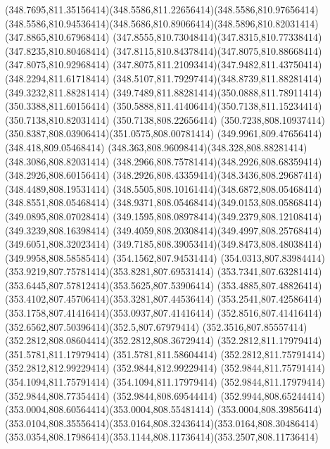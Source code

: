 {{	\curveto(348.7695,811.35156414)(348.5586,811.22656414)(348.5586,810.97656414)
	\curveto(348.5586,810.94536414)(348.5686,810.89066414)(348.5896,810.82031414)
	\lineto(347.8865,810.67968414)
	\curveto(347.8555,810.73048414)(347.8315,810.77338414)(347.8235,810.80468414)
	\curveto(347.8115,810.84378414)(347.8075,810.88668414)(347.8075,810.92968414)
	\curveto(347.8075,811.21093414)(347.9482,811.43750414)(348.2294,811.61718414)
	\curveto(348.5107,811.79297414)(348.8739,811.88281414)(349.3232,811.88281414)
	\curveto(349.7489,811.88281414)(350.0888,811.78911414)(350.3388,811.60156414)
	\curveto(350.5888,811.41406414)(350.7138,811.15234414)(350.7138,810.82031414)
	\lineto(350.7138,808.22656414)
	\curveto(350.7238,808.10937414)(350.8387,808.03906414)(351.0575,808.00781414)
	\closepath
	\moveto(349.9961,809.47656414)
	\lineto(348.418,809.05468414)
	\curveto(348.363,808.96098414)(348.328,808.88281414)(348.3086,808.82031414)
	\curveto(348.2966,808.75781414)(348.2926,808.68359414)(348.2926,808.60156414)
	\curveto(348.2926,808.43359414)(348.3436,808.29687414)(348.4489,808.19531414)
	\curveto(348.5505,808.10161414)(348.6872,808.05468414)(348.8551,808.05468414)
	\curveto(348.9371,808.05468414)(349.0153,808.05868414)(349.0895,808.07028414)
	\curveto(349.1595,808.08978414)(349.2379,808.12108414)(349.3239,808.16398414)
	\curveto(349.4059,808.20308414)(349.4997,808.25768414)(349.6051,808.32023414)
	\curveto(349.7185,808.39053414)(349.8473,808.48038414)(349.9958,808.58585414)
	\closepath
	\moveto(354.1562,807.94531414)
	\curveto(354.0313,807.83984414)(353.9219,807.75781414)(353.8281,807.69531414)
	\curveto(353.7341,807.63281414)(353.6445,807.57812414)(353.5625,807.53906414)
	\curveto(353.4885,807.48826414)(353.4102,807.45706414)(353.3281,807.44536414)
	\curveto(353.2541,807.42586414)(353.1758,807.41416414)(353.0937,807.41416414)
	\curveto(352.8516,807.41416414)(352.6562,807.50396414)(352.5,807.67979414)
	\curveto(352.3516,807.85557414)(352.2812,808.08604414)(352.2812,808.36729414)
	\lineto(352.2812,811.17979414)
	\lineto(351.5781,811.17979414)
	\lineto(351.5781,811.58604414)
	\lineto(352.2812,811.75791414)
	\lineto(352.2812,812.99229414)
	\lineto(352.9844,812.99229414)
	\lineto(352.9844,811.75791414)
	\lineto(354.1094,811.75791414)
	\lineto(354.1094,811.17979414)
	\lineto(352.9844,811.17979414)
	\lineto(352.9844,808.77354414)
	\lineto(352.9844,808.69544414)
	\curveto(352.9944,808.65244414)(353.0004,808.60564414)(353.0004,808.55481414)
	\lineto(353.0004,808.39856414)
	\curveto(353.0104,808.35556414)(353.0164,808.32436414)(353.0164,808.30486414)
	\curveto(353.0354,808.17986414)(353.1144,808.11736414)(353.2507,808.11736414)
}}
